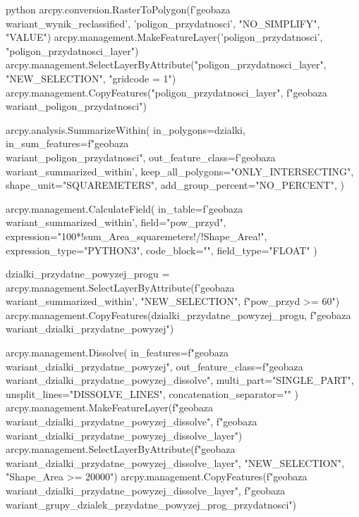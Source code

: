 \documentclass{article}
\begin{document}
\begin{mintedbox}{python}
arcpy.conversion.RasterToPolygon(f'{geobaza}\\{wariant}_wynik_reclassified', 'poligon_przydatnosci', "NO_SIMPLIFY", "VALUE")
arcpy.management.MakeFeatureLayer('poligon_przydatnosci', "poligon_przydatnosci_layer")
arcpy.management.SelectLayerByAttribute("poligon_przydatnosci_layer", "NEW_SELECTION", "gridcode = 1")
arcpy.management.CopyFeatures("poligon_przydatnosci_layer", f"{geobaza}\\{wariant}_poligon_przydatnosci")

arcpy.analysis.SummarizeWithin(
    in_polygons=dzialki,
    in_sum_features=f"{geobaza}\\{wariant}_poligon_przydatnosci",
    out_feature_class=f'{geobaza}\\{wariant}_summarized_within',
    keep_all_polygons="ONLY_INTERSECTING",
    shape_unit="SQUAREMETERS",
    add_group_percent="NO_PERCENT",
)

arcpy.management.CalculateField(
    in_table=f'{geobaza}\\{wariant}_summarized_within',
    field="pow_przyd",
    expression="100*!sum_Area_squaremeters!/!Shape_Area!",
    expression_type="PYTHON3",
    code_block="",
    field_type="FLOAT"
)

dzialki_przydatne_powyzej_progu = arcpy.management.SelectLayerByAttribute(f'{geobaza}\\{wariant}_summarized_within', "NEW_SELECTION", f"pow_przyd >= 60")
arcpy.management.CopyFeatures(dzialki_przydatne_powyzej_progu, f"{geobaza}\\{wariant}_dzialki_przydatne_powyzej")

arcpy.management.Dissolve(
in_features=f"{geobaza}\\{wariant}_dzialki_przydatne_powyzej",
out_feature_class=f"{geobaza}\\{wariant}_dzialki_przydatne_powyzej_dissolve",
multi_part="SINGLE_PART",
unsplit_lines="DISSOLVE_LINES",
concatenation_separator=""
)
arcpy.management.MakeFeatureLayer(f"{geobaza}\\{wariant}_dzialki_przydatne_powyzej_dissolve", f"{geobaza}\\{wariant}_dzialki_przydatne_powyzej_dissolve_layer")
arcpy.management.SelectLayerByAttribute(f"{geobaza}\\{wariant}_dzialki_przydatne_powyzej_dissolve_layer", "NEW_SELECTION", "Shape_Area >= 20000")
arcpy.management.CopyFeatures(f"{geobaza}\\{wariant}_dzialki_przydatne_powyzej_dissolve_layer", f"{geobaza}\\{wariant}_grupy_dzialek_przydatne_powyzej_{prog_przydatnosci}")
\end{mintedbox}
\end{document}
